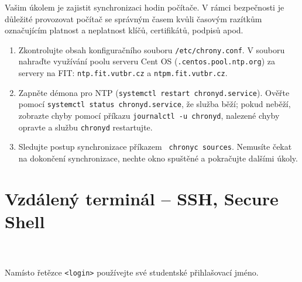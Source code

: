 \documentclass[a4paper,11pt]{article}
\begin{document}
Vašim úkolem je zajistit synchronizaci hodin počítače. V rámci bezpečnosti je
důležité provozovat počítač se správným časem kvůli časovým razítkům
označujícím platnost a neplatnost klíčů, certifikátů, podpisů apod.

\begin{enumerate}

  \item Zkontrolujte obsah konfiguračního souboru {\tt /etc/chrony.conf}. V souboru
    nahraďte využívání poolu serveru Cent OS ({\tt *.centos.pool.ntp.org}) za
    servery na FIT: {\tt ntp.fit.vutbr.cz} a {\tt ntpm.fit.vutbr.cz}.

  \item Zapněte démona pro NTP ({\tt systemctl restart chronyd.service}).
    Ověřte pomocí {\tt systemctl status chronyd.service}, že služba běží; pokud
    neběží, zobrazte chyby pomocí příkazu {\tt journalctl -u chronyd}, nalezené
    chyby opravte a službu {\tt chronyd} restartujte.

  \item Sledujte postup synchronizace příkazem {\tt
    chronyc sources}. Nemusíte čekat na dokončení synchronizace, nechte okno
    spuštěné a pokračujte dalšími úkoly.

\end{enumerate}

\section{Vzdálený terminál -- SSH, Secure Shell}

~\\~\\
Namísto řetězce {\tt <login>} používejte své studentské přihlašovací jméno.
\end{document}
